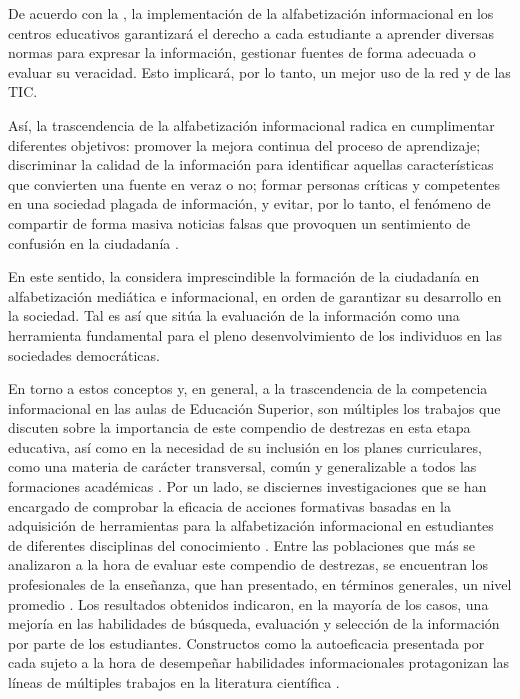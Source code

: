 \documentclass{textolivre}
\begin{document}
De acuerdo con la \cite{oecd2017}, %
la implementación de la alfabetización informacional en los centros educativos garantizará el derecho a cada estudiante a aprender diversas normas para expresar la información, gestionar fuentes de forma adecuada o evaluar su veracidad. Esto implicará, por lo tanto, un mejor uso de la red y de las TIC.

Así, la trascendencia de la alfabetización informacional radica en cumplimentar diferentes objetivos: promover la mejora continua del proceso de aprendizaje; discriminar la calidad de la información para identificar aquellas características que convierten una fuente en veraz o no; formar personas críticas y competentes en una sociedad plagada de información, y evitar, por lo tanto, el fenómeno de compartir de forma masiva noticias falsas que provoquen un sentimiento de confusión en la ciudadanía \cite{balcer2020, klucevsek2017}. %

En este sentido, la \cite{unesco2016} %
considera imprescindible la formación de la ciudadanía en alfabetización mediática e informacional, en orden de garantizar su desarrollo en la sociedad. Tal es así que sitúa la evaluación de la información como una herramienta fundamental para el pleno desenvolvimiento de los individuos en las sociedades democráticas.

En torno a estos conceptos y, en general, a la trascendencia de la competencia informacional en las aulas de Educación Superior, son múltiples los trabajos que discuten sobre la importancia de este compendio de destrezas en esta etapa educativa, así como en la necesidad de su inclusión en los planes curriculares, como una materia de carácter transversal, común y generalizable a todos las formaciones académicas \cite{waltz2020}. %
Por un lado, se disciernes investigaciones que se han encargado de comprobar la eficacia de acciones formativas basadas en la adquisición de herramientas para la alfabetización informacional en estudiantes de diferentes disciplinas del conocimiento \cite{ball2019, george2019, lantz2019, sanches2019}. %
Entre las poblaciones que más se analizaron a la hora de evaluar este compendio de destrezas, se encuentran los profesionales de la enseñanza, que han presentado, en términos generales, un nivel promedio \cite{oliveira2019, godbey2018, bougatzeli2015}. %
Los resultados obtenidos indicaron, en la mayoría de los casos, una mejoría en las habilidades de búsqueda, evaluación y selección de la información por parte de los estudiantes. Constructos como la autoeficacia presentada por cada sujeto a la hora de desempeñar habilidades informacionales protagonizan las líneas de múltiples trabajos en la literatura científica \cite{demeulemeesteretal2019, demeulemeester2018}. %
\end{document}
